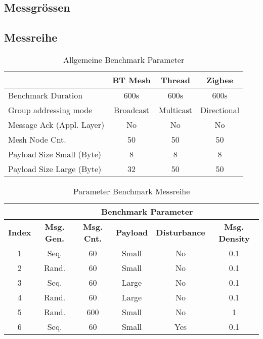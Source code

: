 \subsection{Messgrössen}\label{subsec:MessgrössenMesh}

\subsection{Messreihe}\label{subsec:Messreihe}


\begin{table}[h]
\centering
\begin{tabular}{lccc} 
\toprule
 & BT Mesh & Thread & Zigbee \\ 
\hline
Benchmark Duration & 600s & 600s & 600s \\
Group addressing mode & Broadcast & Multicast & Directional \\
Message Ack (Appl. Layer) & No & No & No \\
Mesh Node Cnt. & 50 & 50 & 50 \\
Payload Size Small (Byte) & 8 & 8 & 8 \\
Payload Size Large (Byte) & 32 & 50 & 50 \\
\bottomrule
\end{tabular}
\caption{Allgemeine Benchmark Parameter}
\label{tab:AllgemeineBenchmarkParameter}
\end{table}

\begin{table}[h]
\centering
\begin{tabular}{|c|c|c|c|c|c|} 
\cline{2-6}
\multicolumn{1}{c|}{} & \multicolumn{5}{c|}{Benchmark Parameter} \\ 
\hline
\textbf{Index}  & \textbf{Msg. Gen.}  & \textbf{Msg. Cnt.}  & \textbf{Payload }  & \textbf{Disturbance}  & \textbf{Msg. Density}  \\ 
\hline
1 & Seq. & 60 & Small & No & 0.1 \\ 
\hline
2 & Rand. & 60 & Small & No & 0.1 \\ 
\hline
3 & Seq. & 60 & Large & No & 0.1 \\ 
\hline
4 & Rand. & 60 & Large & No & 0.1 \\ 
\hline
5 & Rand. & 600 & Small & No & 1 \\ 
\hline
6 & Seq. & 60 & Small & Yes & 0.1 \\
\hline
\end{tabular}
\caption{Parameter Benchmark Messreihe}
\label{tab:ParameterBenchmarkMessreihe}
\end{table}



